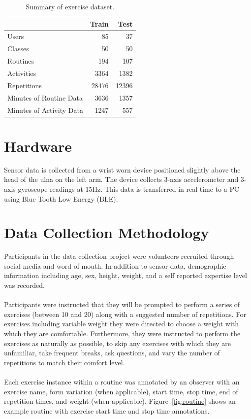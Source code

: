 \documentclass[12pt]{report}
\newcommand{\1}[0]{\mathbbm{1}}
\begin{document}
\begin{table}[ht]
    \centering
    \begin{tabular}{l r r}\hline
    & \textbf{Train} &\textbf{Test} \\\hline
    Users & 85 & 37\\
    Classes & 50 & 50\\
    Routines & 194 & 107\\
    Activities & 3364 & 1382\\
    Repetitions & 28476 & 12396\\
    Minutes of Routine Data & 3636 & 1357\\
    Minutes of Activity Data & 1247 & 557\\
    \end{tabular}
    \caption[Summary of exercise dataset]{Summary of exercise dataset.}
    \label{table:dataset}
\end{table}

\section{Hardware}
Sensor data is collected from a wrist worn device positioned slightly
above the head of the ulna on the left arm.
The device collects 3-axis accelerometer and 3-axis gyroscope readings at 15Hz.
This data is transferred in real-time to a PC using Blue Tooth Low Energy (BLE).

\section{Data Collection Methodology}
Participants in the data collection project were volunteers recruited through social media
and word of mouth. In addition to sensor data, demographic information including age, sex, height, weight,
and a self reported expertise level was recorded.
\\\\
Participants were instructed that they will be prompted to perform a series of exercises (between 10 and 20)
along with a suggested number of repetitions. For exercises including variable weight they were directed
to choose a weight with which they are comfortable. Furthermore, they were instructed to perform the exercises
as naturally as possible, to skip any exercises with which they are unfamiliar, take frequent breaks,
ask questions, and vary the number of repetitions to match their comfort level.
\\\\
Each exercise instance within a routine was annotated by an observer with an exercise name,
form variation (when applicable), start time, stop time, end of repetition times, and weight (when applicable).
Figure~\ref{fig:routine} shows an example routine with exercise start time and stop time annotations.
\end{document}
